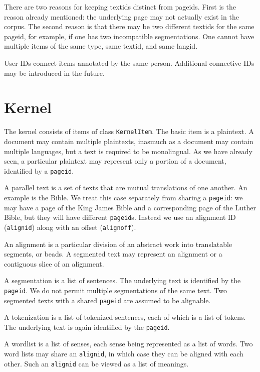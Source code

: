 There are two reasons for keeping textids distinct from pageids.
First is the reason already mentioned: the underlying page may not
actually exist in the corpus.  The second reason is that there may be
two different textids for the same pageid,
for example, if one has two incompatible segmentations.
One cannot have multiple items of the same type, same textid, and same
langid.

User IDs connect items annotated by the same person.  Additional
connective IDs may be introduced in the future.

\section{Kernel}

The kernel consists of items of class {\tt KernelItem}.  The basic
item is a {\df plaintext}.  A document may contain multiple
plaintexts, inasmuch as a document may contain multiple languages, but
a text is required to be monolingual.  As we have already seen, a
particular plaintext may represent only a portion of a document,
identified by a {\tt pageid}.

A {\df parallel text} is a set of texts that are mutual translations of one
another.  An example is the Bible.  We treat this case separately from
sharing a {\tt pageid}: we may have a page of the King James Bible and
a corresponding page of the Luther Bible, but they will have different
{\tt pageid}s.  Instead we use an {\df alignment ID} ({\tt alignid})
along with an {\df offset} ({\tt alignoff}).

An alignment is a particular division of an abstract work into
translatable segments, or {\df beads}.  A segmented text may represent
an alignment or a contiguous slice of an alignment.

A {\df segmentation} is a list of sentences.  The underlying text is
identified by the {\tt pageid}.  We do not permit multiple
segmentations of the same text.  Two segmented texts with a shared
{\tt pageid} are assumed to be alignable.

A {\df tokenization}
is a list of tokenized sentences, each of which is a list of tokens.
The underlying text is again identified by the {\tt pageid}.

A {\df wordlist} is a list of senses, each sense being represented as
a list of words.  Two word lists may share an {\tt alignid}, in which
case they can be aligned with each other.  Such an {\tt alignid} can
be viewed as a list of meanings.

